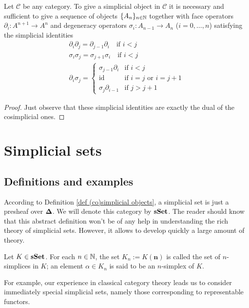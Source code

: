 \begin{refsection}
\begin{cor}
Let $\mathcal C$ be any category. To give a simplicial object in $\mathcal C$ it is necessary and sufficient to give a sequence of objects $\{A_n\}_{n \in \mathbb{N}}$ together with face operators $\partial_i \colon A^{n+1} \to A^n$ and degeneracy operators $\sigma_i \colon A_{n-1} \to A_n$ ($i = 0, \ldots, n$) satisfying the simplicial identities
\begin{gather*}
\partial_i \partial_j = \partial_{j-1} \partial_i \quad \text{if } i < j \\
\sigma_i \sigma_j = \sigma_{j+1} \sigma_i \quad \text{if } i < j \\
\partial_i \sigma_j = \begin{cases} \sigma_{j-1} \partial_i & \text{if } i < j \\
\mathrm{id} & \text{if } i = j \text{ or } i = j+1 \\ \sigma_j \partial_{i-1} & \text{if } j > j+1 \end{cases}
\end{gather*}
\end{cor}

\begin{proof}
Just observe that these simplicial identities are exactly the dual of the cosimplicial ones.
\end{proof}

\section{Simplicial sets}

\subsection{Definitions and examples}

According to Definition \ref{def (co)simplicial objects}, a simplicial set is just a presheaf over $\mathbf \Delta$. We will denote this category by $\mathbf{sSet}$. The reader should know that this abstract definition won't be of any help in understanding the rich theory of simplicial sets. However, it allows to develop quickly a large amount of theory.

\begin{defin}
Let $K \in \mathbf{sSet}$. For each $n \in \mathbb{N}$, the set $K_n := K(\mathbf n)$ is called the set of $n$-simplices in $K$; an element $\alpha \in K_n$ is said to be an $n$-simplex of $K$.
\end{defin}

For example, our experience in classical category theory leads us to consider immediately special simplicial sets, namely those corresponding to representable functors.


\end{refsection}
